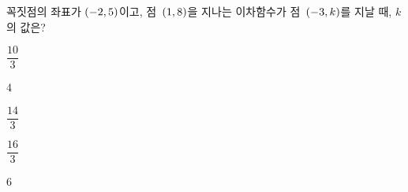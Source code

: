 꼭짓점의 좌표가 $(-2{,}\mkern3mu 5)$이고, 점~$(1{,}\mkern3mu 8)$을 지나는 이차함수가 점~$(-3{,}\mkern3mu k)$를 지날 때, $k$의 값은?
\begin{choices32}{\rule[-3ex]{0pt}{8ex}$\dfrac{10}{3}$}{\rule[-3ex]{0pt}{8ex}$4$}{\rule[-3ex]{0pt}{8ex}$\dfrac{14}{3}$}{\rule[-3ex]{0pt}{8ex}$\dfrac{16}{3}$}{\rule[-3ex]{0pt}{8ex}$6$}\end{choices32}
